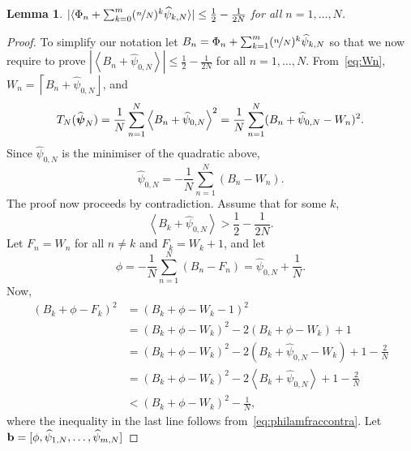 \documentclass[aap]{imsart}
\newcommand{\fracpart}[1]{\left\langle #1 \right\rangle}
\newcommand{\sfracpart}[1]{\langle #1 \rangle}
\newcommand{\abs}[1]{\left\vert #1 \right\vert}
\newcommand{\sabs}[1]{\vert #1 \vert}
\newcommand{\round}[1]{{\left\lceil #1 \right\rfloor}}
\newtheorem{lemma}{Lemma}
\begin{document}
\begin{lemma}\label{lem:boundonhatlambda} $\sabs{\sfracpart{\Phi_n + \sum_{k=0}^m (\nicefrac{n}{N})^k \widehat{\psi}_{k,N}}} \leq \frac{1}{2} - \frac{1}{2N}$ for all $n = 1, \dots, N$.
\end{lemma}
\begin{proof}
To simplify our notation let $B_n = \Phi_n + \sum_{k=1}^m (\nicefrac{n}{N})^k \widehat{\psi}_{k,N}$ so that we now require to prove $\abs{\fracpart{B_n + \widehat{\psi}_{0,N}}} \leq \frac{1}{2} - \frac{1}{2N}$ for all $n = 1, \dots, N$.  From~\eqref{eq:Wn}, $W_n = \round{B_n + \widehat{\psi}_{0,N}}$, and 
\begin{align*}
T_N(\widehat{\psibf}_N) = \frac{1}{N}\sum_{n=1}^N \fracpart{B_n + \widehat{\psi}_{0,N}}^2= \frac{1}{N}\sum_{n=1}^N (B_n + \widehat{\psi}_{0,N} - W_n)^2.
\end{align*}
Since $\widehat{\psi}_{0,N}$ is the minimiser of the quadratic above,
\begin{equation}\label{eq:lamsum}
\widehat{\psi}_{0,N} = -\frac{1}{N}\sum_{n=1}^N(B_n - W_n).
\end{equation}
The proof now proceeds by contradiction.  Assume that for some $k$,
\begin{equation}\label{eq:philamfraccontra}
\fracpart{B_k + \widehat{\psi}_{0,N}} > \frac{1}{2} - \frac{1}{2N}.
\end{equation}
Let $F_n = W_n$ for all $n \neq k$ and $F_k = W_k + 1$, and let
\[
\phi = -\frac{1}{N}\sum_{n=1}^N(B_n - F_n) = \widehat{\psi}_{0,N} + \frac{1}{N}.
\]
Now,
\begin{align}
(B_k + \phi - F_k)^2 &= (B_k + \phi - W_k - 1)^2 \nonumber \\
&= (B_k + \phi - W_k)^2 - 2(B_k + \phi - W_k) + 1 \nonumber \\
&= (B_k + \phi - W_k)^2 - 2(B_k + \widehat{\psi}_{0,N} - W_k) + 1 - \frac{2}{N} \nonumber \\
&= (B_k + \phi - W_k)^2 - 2\fracpart{B_k + \widehat{\psi}_{0,N}} + 1 - \frac{2}{N} \nonumber \\
&< (B_k + \phi - W_k)^2 - \frac{1}{N}, \label{eq:Bkineq}
\end{align}
where the inequality in the last line follows from~\eqref{eq:philamfraccontra}. Let $\mathbf{b} = [ \phi,  \widehat{\psi}_{1,N} , \dots , \widehat{\psi}_{m,N}]$

\end{proof}
\end{document}
